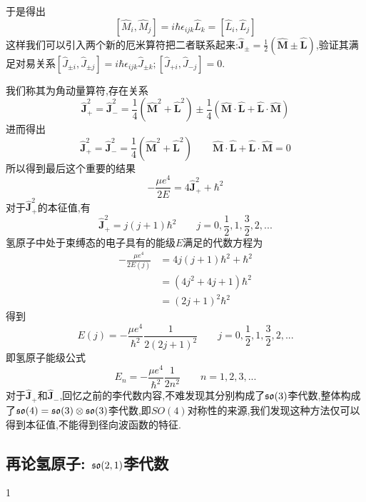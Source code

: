 于是得出
\begin{equation}
    \displaystyle[\hat{M}_i,\hat{M}_j ]=i\hbar \epsilon _{ijk}\hat{L}_k =[\hat{L}_i,\hat{L}_j]
\end{equation}
这样我们可以引入两个新的厄米算符把二者联系起来:$\displaystyle\hat{\bm{J}}_\pm =\frac{1}{2}(\hat{\bm{M}}\pm \hat{\bm{L}} )  $,验证其满足对易关系$[\hat{J}_{\pm i}, \hat{J}_{\pm j}]=i\hbar \epsilon _{ijk} \hat{J}_{\pm k};[\hat{J}_{+ i}, \hat{J}_{- j}]=0$.

我们称其为角动量算符,存在关系
\begin{equation}
    \displaystyle\hat{\bm{J}}^2_{+}= \hat{\bm{J}}^2_{-}=\frac{1}{4}(\hat{\bm{M}}^2+\hat{\bm{L}}^2) \pm \frac{1}{4}(\hat{\bm{M}}\cdot\hat{\bm{L}}+\hat{\bm{L}}\cdot \hat{\bm{M}}) 
\end{equation}
进而得出
\begin{equation}
    \displaystyle\hat{\bm{J}}^2_{+}= \hat{\bm{J}}^2_{-}=\frac{1}{4}(\hat{\bm{M}}^2+\hat{\bm{L}}^2) \qquad  \hat{\bm{M}}\cdot\hat{\bm{L}}+\hat{\bm{L}}\cdot \hat{\bm{M}}=0
\end{equation}
所以得到最后这个重要的结果
\begin{equation}
    \displaystyle-\frac{\mu e^4}{2E}=4\hat{\bm{J}}^2_++\hbar ^2  
\end{equation}
对于$\hat{\bm{J}}^2_+$的本征值,有
\begin{equation}
    \displaystyle\hat{\bm{J}}^2_+=j(j+1)\hbar^2 \qquad j=0,\frac{1}{2},1,\frac{3}{2},2,...
\end{equation}
氢原子中处于束缚态的电子具有的能级$ E $满足的代数方程为
\begin{equation}
    \begin{align}-\frac{\mu e^4}{2E(j)} &=4j(j+1)\hbar^2+\hbar ^2  \\&  =(4j^2+4j+1)\hbar^2\\& =(2j+1)^2\hbar^2\end{align}
\end{equation}
得到
$$\displaystyle E(j)=-\frac{\mu e^4}{\hbar^2}\frac{1}{2(2j+1)^2}\qquad j=0,\frac{1}{2},1,\frac{3}{2},2,...$$
即氢原子能级公式
\begin{equation}
    \displaystyle E_n=-\frac{\mu e^4}{\hbar^2}\frac{1}{2n^2}\qquad n=1,2,3,...
\end{equation}
对于$\hat{\bm{J}}_+$和$\hat{\bm{J}}_-$,回忆之前的李代数内容,不难发现其分别构成了$\mathfrak{so}(3)$李代数,整体构成了$\mathfrak{so}(4)=\mathfrak{so}(3)\otimes\mathfrak{so}(3)$李代数,即$SO(4)$对称性的来源,我们发现这种方法仅可以得到本征值,不能得到径向波函数的特征.
\subsection{再论氢原子: $\mathfrak{so}(2,1)$李代数}
1




